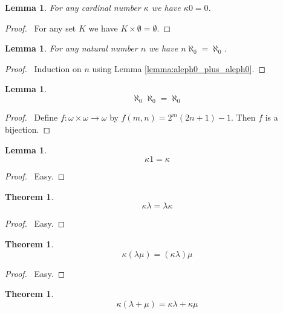 \documentclass{article}
\let\qed\relax
\newtheorem{lemma}[axiom]{Lemma}
\newtheorem{theorem}[axiom]{Theorem}
\theoremstyle{definition}
\begin{document}
    \begin{lemma}
        For any cardinal number $\kappa$ we have $\kappa 0 = 0$.
    \end{lemma}

    \begin{proof}
        \pf\ For any set $K$ we have $K \times \emptyset = \emptyset$. \qed
    \end{proof}

    \begin{lemma}
        For any natural number $n$ we have $n \aleph_0 = \aleph_0$.
    \end{lemma}

    \begin{proof}
        \pf\ Induction on $n$ using Lemma \ref{lemma:aleph0_plus_aleph0}. \qed
    \end{proof}

    \begin{lemma}
        \[ \aleph_0 \aleph_0 = \aleph_0 \]
    \end{lemma}

    \begin{proof}
        \pf\ Define $f : \omega \times \omega \rightarrow \omega$ by $f(m,n) = 2^m(2n+1)-1$. Then $f$
        is a bijection. \qed
    \end{proof}

    \begin{lemma}
        \[ \kappa 1 = \kappa \]
    \end{lemma}

    \begin{proof}
        \pf\ Easy. \qed
    \end{proof}

    \begin{theorem}
        \[ \kappa \lambda = \lambda \kappa \]
    \end{theorem}

    \begin{proof}
        \pf\ Easy. \qed
    \end{proof}

    \begin{theorem}
        \[ \kappa (\lambda \mu) = (\kappa \lambda) \mu \]
    \end{theorem}

    \begin{proof}
        \pf\ Easy. \qed
    \end{proof}

    \begin{theorem}
        \[ \kappa (\lambda + \mu) = \kappa \lambda + \kappa \mu \]
    \end{theorem}
\end{document}
